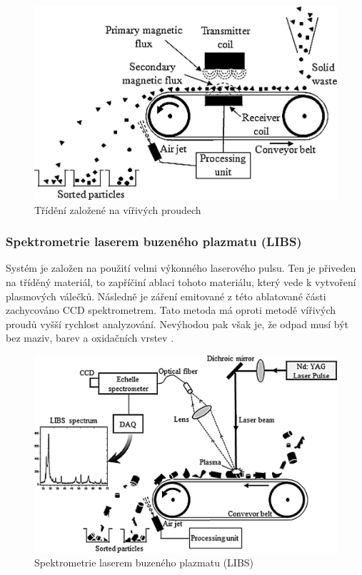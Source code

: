 \documentclass[a4paper,10pt]{article}
\theoremstyle{definition}
\begin{document}
\begin{figure}[H]
\begin{center}
\includegraphics[scale=1.1]{Images/Vířivé proudy.jpg}
\caption{Třídění založené na vířivých proudech \cite{GUNDUPALLI201756}}
\label{fig:1}
\end{center}
\end{figure}

\newpage
\subsubsection*{Spektrometrie laserem buzeného plazmatu (LIBS)}
Systém je založen na použití velmi výkonného laserového pulsu. Ten je přiveden na tříděný materiál, to zapříčiní ablaci tohoto materiálu, který vede k vytvoření plasmových válečků. Následně je záření emitované z této ablatované části zachycováno CCD spektrometrem. Tato metoda má oproti metodě vířivých proudů vyšší rychlost analyzování. Nevýhodou pak však je, že odpad musí být bez maziv, barev a oxidačních vrstev \cite{GUNDUPALLI201756} \cite{solo2004evaluation}.

\begin{figure}[H]
\begin{center}
\includegraphics[scale=0.85]{Images/LIBS.jpg}
\caption{Spektrometrie laserem buzeného plazmatu (LIBS) \cite{GUNDUPALLI201756}}
\label{fig:1}
\end{center}
\end{figure}
\end{document}
